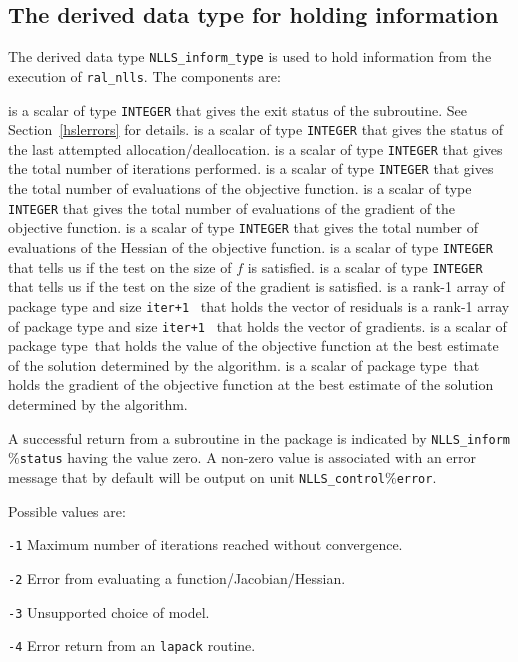 \documentclass{spec}
\newcommand{\scalarinteger}{is a scalar of type {\tt INTEGER} }
\newcommand{\scalarreal}{is a scalar of package type\ }
\newcommand{\ronearrayreal}[1]{is a rank-1 array of package type and size {\tt #1}\ }
\begin{document}
\subsection{The derived data type for holding information}
\label{typeinform} 
The derived data type {\tt NLLS\_inform\_type} is used
to hold information from the execution of {\tt ral\_nlls}.
The components are:
\begin{description}
       \scalarinteger that gives the exit status of the subroutine.  See Section~\ref{hslerrors} for details.
 \scalarinteger that gives the status of the last attempted allocation/deallocation.
 \scalarinteger that gives the total number of iterations performed.
 \scalarinteger that gives the total number of evaluations of the objective function.
 \scalarinteger that gives the total number of evaluations of the gradient of the objective function.
 \scalarinteger that gives the total number of evaluations of the Hessian of the objective function.
 \scalarinteger that tells us if the test on the size of \(f\) is satisfied.
 \scalarinteger that tells us if the test on the size of the gradient is satisfied.
 \ronearrayreal{iter+1} that holds the vector of residuals
 \ronearrayreal{iter+1} that holds the vector of gradients.
 \scalarreal that holds the value of the objective function at the best estimate of the solution determined by the algorithm.
 \scalarreal that holds the gradient of the objective function at the best estimate of the solution determined by the algorithm.
\end{description}


\hslerrors

A successful return from a subroutine in the package is indicated by 
{\tt NLLS\_inform$\%$status} having the value zero.  
A non-zero value is associated with an error message that by default will  
be output on unit {\tt NLLS\_control$\%$error}. 

Possible values are:
\begin{description}
\item{} {\tt -1} Maximum number of iterations reached without convergence.
\item{} {\tt -2} Error from evaluating a function/Jacobian/Hessian.
\item{} {\tt -3} Unsupported choice of model.
\item{} {\tt -4} Error return from an {\tt lapack} routine.
\end{description}
\end{document}
